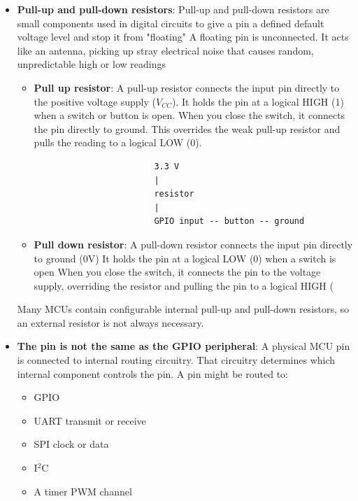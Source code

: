 \documentclass{report}
\begin{document}
\begin{itemize}
        \item \textbf{Pull-up and pull-down resistors}: Pull-up and pull-down resistors are small components used in digital circuits to give a pin a defined default voltage level and stop it from "floating"
            \bigbreak \noindent 
            A floating pin is unconnected. It acts like an antenna, picking up stray electrical noise that causes random, unpredictable high or low readings
            \begin{itemize}
                \item \textbf{Pull up resistor}: A pull-up resistor connects the input pin directly to the positive voltage supply (\(V_{CC}\)). It holds the pin at a logical HIGH (1) when a switch or button is open.
                    \bigbreak \noindent 
                    When you close the switch, it connects the pin directly to ground. This overrides the weak pull-up resistor and pulls the reading to a logical LOW (0).
                    \begin{verbatim}
                        3.3 V
                        |
                        resistor
                        |
                        GPIO input -- button -- ground
                    \end{verbatim}
                \item \textbf{Pull down resistor}:  A pull-down resistor connects the input pin directly to ground (0V) It holds the pin at a logical LOW (0) when a switch is open
                    \bigbreak \noindent 
                    When you close the switch, it connects the pin to the voltage supply, overriding the resistor and pulling the pin to a logical HIGH (
            \end{itemize}
            Many MCUs contain configurable internal pull-up and pull-down resistors, so an external resistor is not always necessary.
        \item \textbf{The pin is not the same as the GPIO peripheral}: A physical MCU pin is connected to internal routing circuitry. That circuitry determines which internal component controls the pin.
            \bigbreak \noindent 
            A pin might be routed to:
            \begin{itemize}
                \item GPIO
                \item UART transmit or receive
                \item SPI clock or data
                \item I$^2$C
                \item A timer PWM channel

\end{itemize}
\end{itemize}
\end{document}

